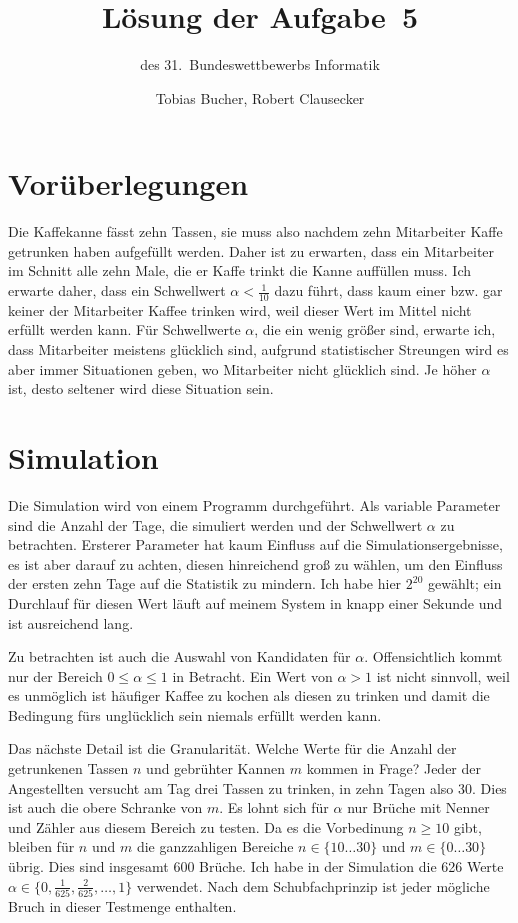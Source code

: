 \documentclass{scrartcl}
\title{Lösung der Aufgabe~5}
\subtitle{des 31.~Bundeswettbewerbs Informatik}
\author{Tobias Bucher, Robert Clausecker}
\begin{document}
\maketitle
\section{Vorüberlegungen}
Die Kaffekanne fässt zehn Tassen, sie muss also nachdem zehn Mitarbeiter Kaffe
getrunken haben aufgefüllt werden. Daher ist zu erwarten, dass ein Mitarbeiter
im Schnitt alle zehn Male, die er Kaffe trinkt die Kanne auffüllen muss. Ich
erwarte daher, dass ein Schwellwert $\alpha<\frac1{10}$ dazu führt, dass kaum
einer bzw. gar keiner der Mitarbeiter Kaffee trinken wird, weil dieser Wert im
Mittel nicht erfüllt werden kann. Für Schwellwerte $\alpha$, die ein wenig
größer sind, erwarte ich, dass Mitarbeiter meistens glücklich sind, aufgrund
statistischer Streungen wird es aber immer Situationen geben, wo Mitarbeiter
nicht glücklich sind. Je höher $\alpha$ ist, desto seltener wird diese Situation
sein.

\section{Simulation}
Die Simulation wird von einem Programm durchgeführt. Als variable Parameter
sind die Anzahl der Tage, die simuliert werden und der Schwellwert $\alpha$ zu
betrachten. Ersterer Parameter hat kaum Einfluss auf die Simulationsergebnisse,
es ist aber darauf zu achten, diesen hinreichend groß zu wählen, um den Einfluss
der ersten zehn Tage auf die Statistik zu mindern. Ich habe hier $2^{20}$
gewählt; ein Durchlauf für diesen Wert läuft auf meinem System in knapp einer
Sekunde und ist ausreichend lang.

Zu betrachten ist auch die Auswahl von Kandidaten für $\alpha$. Offensichtlich
kommt nur der Bereich $0\le\alpha\le1$ in Betracht. Ein Wert von $\alpha>1$ ist
nicht sinnvoll, weil es unmöglich ist häufiger Kaffee zu kochen als diesen zu
trinken und damit die Bedingung fürs unglücklich sein niemals erfüllt werden
kann.

Das nächste Detail ist die Granularität. Welche Werte für die Anzahl der
getrunkenen Tassen $n$ und gebrühter Kannen $m$ kommen in Frage? Jeder der
Angestellten versucht am Tag drei Tassen zu trinken, in zehn Tagen also 30. Dies
ist auch die obere Schranke von $m$. Es lohnt sich für $\alpha$ nur Brüche mit
Nenner und Zähler aus diesem Bereich zu testen. Da es die Vorbedinung $n\ge10$
gibt, bleiben für $n$ und $m$ die ganzzahligen Bereiche $n\in\{10\dots30\}$ und
$m\in\{0\dots30\}$ übrig. Dies sind insgesamt 600 Brüche. Ich habe in der
Simulation die 626 Werte $\alpha\in\{0,\frac1{625},\frac2{625},\dots,1\}$
verwendet. Nach dem Schubfachprinzip ist jeder mögliche Bruch in dieser
Testmenge enthalten.
\end{document}
